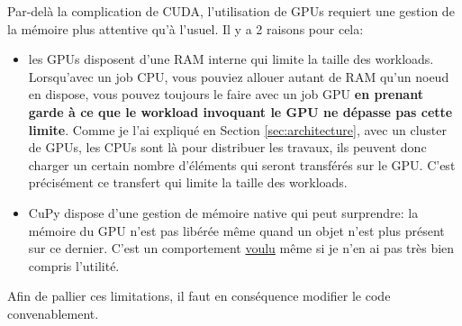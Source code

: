 \documentclass[13pt, a4paper]{extarticle}
\begin{document}
\noindent Par-delà la complication de CUDA, l'utilisation de GPUs requiert 
une gestion de la mémoire plus attentive qu'à l'usuel. Il y a 2 raisons pour cela:
\begin{itemize}
  \item les GPUs disposent d'une RAM interne qui limite la taille des workloads.
        Lorsqu'avec un job CPU, vous pouviez allouer autant de RAM qu'un noeud
        en dispose, vous pouvez toujours le faire avec un job GPU {\bf en prenant
        garde à ce que le workload invoquant le GPU ne dépasse pas cette limite}.
        Comme je l'ai expliqué en Section \ref{sec:architecture}, avec un cluster de GPUs, 
        les CPUs sont là pour distribuer les travaux, ils peuvent donc charger un certain nombre
        d'éléments qui seront transférés sur le GPU. C'est précisément ce transfert
        qui limite la taille des workloads. 
  \item CuPy dispose d'une gestion de mémoire native qui peut surprendre: 
        la mémoire du GPU n'est pas libérée même quand un objet n'est plus présent
        sur ce dernier. C'est un comportement \href{https://docs.cupy.dev/en/stable/user_guide/memory.html}
        {voulu} même si je n'en ai pas très bien compris l'utilité.
\end{itemize}
Afin de pallier ces limitations, il faut en conséquence modifier le code
convenablement.
\end{document}
